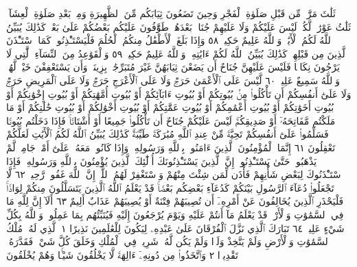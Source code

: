 ثَلَٰثَ مَرَّٰتࣲۚ مِّن قَبْلِ صَلَوٰةِ ٱلْفَجْرِ وَحِينَ تَضَعُونَ ثِيَابَكُم مِّنَ
ٱلظَّهِيرَةِ وَمِنۢ بَعْدِ صَلَوٰةِ ٱلْعِشَآءِۚ ثَلَٰثُ عَوْرَٰتࣲ لَّكُمْۚ لَيْسَ عَلَيْكُمْ
وَلَا عَلَيْهِمْ جُنَاحُۢ بَعْدَهُنَّۚ طَوَّٰفُونَ عَلَيْكُم بَعْضُكُمْ عَلَىٰ بَعْضࣲۚ
كَذَٰلِكَ يُبَيِّنُ ٱللَّهُ لَكُمُ ٱلْأٓيَٰتِۗ وَٱللَّهُ عَلِيمٌ حَكِيمࣱ ٥٨
وَإِذَا بَلَغَ ٱلْأَطْفَٰلُ مِنكُمُ ٱلْحُلُمَ فَلْيَسْتَـْٔذِنُوا۟ كَمَا
ٱسْتَـْٔذَنَ ٱلَّذِينَ مِن قَبْلِهِمْۚ كَذَٰلِكَ يُبَيِّنُ ٱللَّهُ لَكُمْ
ءَايَٰتِهِۦۗ وَٱللَّهُ عَلِيمٌ حَكِيمࣱ ٥٩ وَٱلْقَوَٰعِدُ مِنَ ٱلنِّسَآءِ
ٱلَّٰتِي لَا يَرْجُونَ نِكَاحࣰا فَلَيْسَ عَلَيْهِنَّ جُنَاحٌ أَن يَضَعْنَ
ثِيَابَهُنَّ غَيْرَ مُتَبَرِّجَٰتِۭ بِزِينَةࣲۖ وَأَن يَسْتَعْفِفْنَ خَيْرࣱ
لَّهُنَّۗ وَٱللَّهُ سَمِيعٌ عَلِيمࣱ ٦٠ لَّيْسَ عَلَى ٱلْأَعْمَىٰ حَرَجࣱ وَلَا
عَلَى ٱلْأَعْرَجِ حَرَجࣱ وَلَا عَلَى ٱلْمَرِيضِ حَرَجࣱ وَلَا عَلَىٰٓ أَنفُسِكُمْ
أَن تَأْكُلُوا۟ مِنۢ بُيُوتِكُمْ أَوْ بُيُوتِ ءَابَآئِكُمْ أَوْ بُيُوتِ
أُمَّهَٰتِكُمْ أَوْ بُيُوتِ إِخْوَٰنِكُمْ أَوْ بُيُوتِ أَخَوَٰتِكُمْ
أَوْ بُيُوتِ أَعْمَٰمِكُمْ أَوْ بُيُوتِ عَمَّٰتِكُمْ أَوْ بُيُوتِ
أَخْوَٰلِكُمْ أَوْ بُيُوتِ خَٰلَٰتِكُمْ أَوْ مَا مَلَكْتُم
مَّفَاتِحَهُۥٓ أَوْ صَدِيقِكُمْۚ لَيْسَ عَلَيْكُمْ جُنَاحٌ أَن
تَأْكُلُوا۟ جَمِيعًا أَوْ أَشْتَاتࣰاۚ فَإِذَا دَخَلْتُم بُيُوتࣰا فَسَلِّمُوا۟
عَلَىٰٓ أَنفُسِكُمْ تَحِيَّةࣰ مِّنْ عِندِ ٱللَّهِ مُبَٰرَكَةࣰ طَيِّبَةࣰۚ كَذَٰلِكَ
يُبَيِّنُ ٱللَّهُ لَكُمُ ٱلْأٓيَٰتِ لَعَلَّكُمْ تَعْقِلُونَ ٦١
إِنَّمَا ٱلْمُؤْمِنُونَ ٱلَّذِينَ ءَامَنُوا۟ بِٱللَّهِ وَرَسُولِهِۦ وَإِذَا كَانُوا۟ مَعَهُۥ
عَلَىٰٓ أَمْرࣲ جَامِعࣲ لَّمْ يَذْهَبُوا۟ حَتَّىٰ يَسْتَـْٔذِنُوهُۚ إِنَّ ٱلَّذِينَ يَسْتَـْٔذِنُونَكَ
أُو۟لَٰٓئِكَ ٱلَّذِينَ يُؤْمِنُونَ بِٱللَّهِ وَرَسُولِهِۦۚ فَإِذَا ٱسْتَـْٔذَنُوكَ
لِبَعْضِ شَأْنِهِمْ فَأْذَن لِّمَن شِئْتَ مِنْهُمْ وَٱسْتَغْفِرْ لَهُمُ
ٱللَّهَۚ إِنَّ ٱللَّهَ غَفُورࣱ رَّحِيمࣱ ٦٢ لَّا تَجْعَلُوا۟ دُعَآءَ ٱلرَّسُولِ
بَيْنَكُمْ كَدُعَآءِ بَعْضِكُم بَعْضࣰاۚ قَدْ يَعْلَمُ ٱللَّهُ ٱلَّذِينَ
يَتَسَلَّلُونَ مِنكُمْ لِوَاذࣰاۚ فَلْيَحْذَرِ ٱلَّذِينَ يُخَالِفُونَ عَنْ
أَمْرِهِۦٓ أَن تُصِيبَهُمْ فِتْنَةٌ أَوْ يُصِيبَهُمْ عَذَابٌ أَلِيمٌ ٦٣ أَلَآ إِنَّ
لِلَّهِ مَا فِي ٱلسَّمَٰوَٰتِ وَٱلْأَرْضِۖ قَدْ يَعْلَمُ مَآ أَنتُمْ عَلَيْهِ وَيَوْمَ
يُرْجَعُونَ إِلَيْهِ فَيُنَبِّئُهُم بِمَا عَمِلُوا۟ۗ وَٱللَّهُ بِكُلِّ شَيْءٍ عَلِيمُۢ ٦٤
تَبَارَكَ ٱلَّذِي نَزَّلَ ٱلْفُرْقَانَ عَلَىٰ عَبْدِهِۦ لِيَكُونَ لِلْعَٰلَمِينَ نَذِيرًا ١
ٱلَّذِي لَهُۥ مُلْكُ ٱلسَّمَٰوَٰتِ وَٱلْأَرْضِ وَلَمْ يَتَّخِذْ وَلَدࣰا وَلَمْ يَكُن
لَّهُۥ شَرِيكࣱ فِي ٱلْمُلْكِ وَخَلَقَ كُلَّ شَيْءࣲ فَقَدَّرَهُۥ تَقْدِيرࣰا ٢
وَٱتَّخَذُوا۟ مِن دُونِهِۦٓ ءَالِهَةࣰ لَّا يَخْلُقُونَ شَيْـࣰٔا وَهُمْ يُخْلَقُونَ
